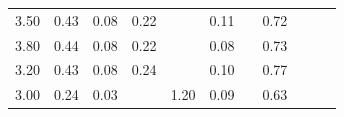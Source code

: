 \begin{refsection}[referencesCh3]
\begin{table}
\begin{adjustbox}{scale=0.65,center}
\begin{tabular}{@{}ccccccccccc@{}}
		3.50                                                         & 0.43                                                & 0.08                                                & 0.22                                                &                                                     & 0.11                                                 &                                                     & 0.72                                                  &                                                         &                                                      & \cite{Tampere}                                                        \\
		3.80                                                         & 0.44                                                & 0.08                                                & 0.22                                                &                                                     & 0.08                                                 &                                                     & 0.73                                                  &                                                         &                                                      & \cite{Tampere}                                                        \\
		3.20                                                         & 0.43                                                & 0.08                                                & 0.24                                                &                                                     & 0.10                                                 &                                                     & 0.77                                                  &                                                         &                                                      & \cite{Tampere}                                                       \\
		3.00                                                         & 0.24                                                & 0.03                                                &                                                     & 1.20                                                & 0.09                                                 &                                                     & 0.63                                                  &                                                         &                                                      & \cite{Loes}                                                                 \\

\end{tabular}
\end{adjustbox}
\end{table}
\end{refsection}
